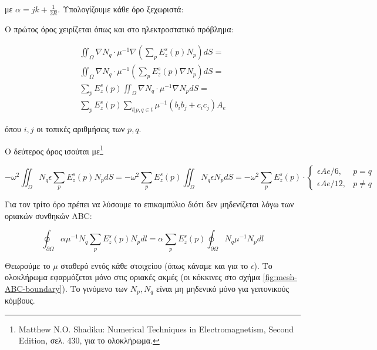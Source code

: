 \documentclass[10pt, letterpaper]{article}
\newcommand{\en}{\selectlanguage{english}}
\newcommand{\gr}{\selectlanguage{greek}}
\begin{document}
με $\alpha = jk + \frac{1}{2R}$.
Υπολογίζουμε κάθε όρο ξεχωριστά:

Ο πρώτος όρος χειρίζεται όπως και στο ηλεκτροστατικό πρόβλημα:

\begin{equation}  \label{eq:first_int}
  \begin{aligned}
    \iint_{\Omega} \nabla N_q \cdot \mu^{-1}  \nabla \left( \sum_p E_z^s(p) N_p \right) dS  = \\
    \iint_{\Omega} \nabla N_q \cdot \mu^{-1}   \left( \sum_p E_z^s(p) \nabla N_p \right) dS  = \\
    \sum_p E_z^s(p) \iint_{\Omega} \nabla N_q \cdot \mu^{-1}   \nabla N_p dS  = \\ 
    \sum_p E_z^s(p) \sum_{t | p,q \in t} \mu^{-1} (b_ib_j + c_ic_j) A_e
  \end{aligned}
\end{equation}

όπου $i,j$ οι τοπικές αριθμήσεις των $p,q$. 

Ο δεύτερος όρος ισούται με\footnote{\textlatin{Matthew N.O. Shadiku: Numerical Techniques in Electromagnetism, Second Edition}, σελ.  430, για το ολοκλήρωμα.}

\begin{equation}  \label{eq:second_int}
    - \omega^2 \iint_{\Omega} N_q \epsilon \sum_p E_z^s(p) N_p dS = 
    - \omega^2 \sum_p E_z^s(p) \iint_{\Omega} N_q \epsilon  N_p dS = 
    - \omega^2 \sum_p E_z^s(p) \cdot
    \begin{cases}
      \epsilon Ae / 6, & p = q \\ 
      \epsilon Ae / 12, & p \neq q
    \end{cases}
\end{equation}




Για τον τρίτο όρο πρέπει να λύσουμε το επικαμπύλιο διότι δεν μηδενίζεται λόγω των οριακών συνθηκών \en ABC: \gr 

\begin{equation}
    \oint_{\partial \Omega} \alpha \mu^{-1} N_q \sum_{p} E_z^s(p) N_p dl = \alpha \sum_p E_z^s(p) \oint_{\partial \Omega} N_q \mu^{-1} N_p dl
\end{equation}

Θεωρούμε το $\mu$ σταθερό εντός κάθε στοιχείου (όπως κάναμε και για το $\epsilon$).
Το ολοκλήρωμα εφαρμόζεται μόνο στις οριακές ακμές (οι κόκκινες στο σχήμα \ref{fig:mesh-ABC-boundary}). 
Το γινόμενο των $N_p, N_q$ είναι μη μηδενικό μόνο για γειτονικούς κόμβους.
\end{document}
